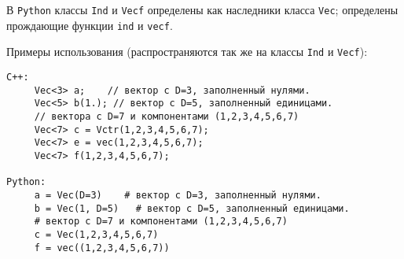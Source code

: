 В  {\tt Python} классы {\tt Ind} и {\tt Vecf} определены как наследники класса {\tt Vec}; определены прождающие функции
{\tt ind} и {\tt vecf}.

Примеры использования (распространяются так же на классы {\tt Ind} и {\tt Vecf}):
\begin{verbatim}
C++:
     Vec<3> a;    // вектор с D=3, заполненный нулями.
     Vec<5> b(1.); // вектор с D=5, заполненный единицами.
     // вектора с D=7 и компонентами (1,2,3,4,5,6,7)
     Vec<7> c = Vctr(1,2,3,4,5,6,7);  
     Vec<7> e = vec(1,2,3,4,5,6,7); 
     Vec<7> f(1,2,3,4,5,6,7); 

Python:
     a = Vec(D=3)    # вектор с D=3, заполненный нулями.
     b = Vec(1, D=5)   # вектор с D=5, заполненный единицами.
     # вектор с D=7 и компонентами (1,2,3,4,5,6,7)
     c = Vec(1,2,3,4,5,6,7) 
     f = vec((1,2,3,4,5,6,7)) 
\end{verbatim}


